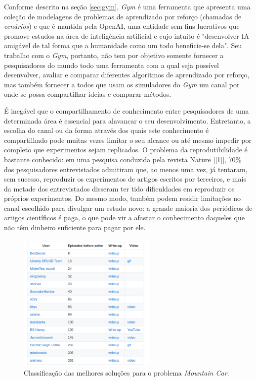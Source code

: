 \documentclass[cic,tc]{iiufrgs}
\begin{document}
Conforme descrito na seção \ref{sec:gym}, \textit{Gym} é uma ferramenta que
apresenta uma coleção de modelagens de problemas de aprendizado por reforço
(chamadas de \textit{cenários}) e que é mantida pela OpenAI, uma entidade sem
fins lucrativos que promove estudos na área de inteligência artificial e cujo
intuito é "desenvolver IA amigável de tal forma que a humanidade como um todo
beneficie-se dela". Seu trabalho com o \textit{Gym}, portanto, não tem por
objetivo somente fornecer a pesquisadores do mundo todo uma ferramenta com a
qual seja possível desenvolver, avaliar e comparar diferentes algoritmos de
aprendizado por reforço, mas também fornecer a todos que usam os simuladores do
\textit{Gym} um canal por onde se possa compartilhar ideias e comparar métodos.


É inegável que o compartilhamento de conhecimento entre pesquisadores de uma
determinada área é essencial para alavancar o seu desenvolvimento. Entretanto, a
escolha do canal ou da forma através dos quais este conhecimento é compartilhado
pode muitas vezes limitar o seu alcance ou até mesmo impedir por completo que
experimentos sejam replicados. O problema da reprodutibilidade é bastante
conhecido: em uma pesquisa conduzida pela revista Nature [[1]], 70\% dos
pesquisadores entrevistados admitiram que, ao menos uma vez, já tentaram, sem
sucesso, reproduzir os experimentos de artigos escritos por terceiros, e mais da
metade dos entrevistados disseram ter tido dificuldades em reproduzir os
próprios experimentos. Do mesmo modo, também podem residir limitações no canal
escolhido para divulgar um estudo novo: a grande maioria dos periódicos de
artigos científicos é paga, o que pode vir a afastar o conhecimento daqueles que
não têm dinheiro suficiente para pagar por ele.


\begin{figure}[h]
    \caption{Classificação das melhores soluções para o problema
    \textit{Mountain Car}.}
    \begin{center}
      \includegraphics[width=0.6\textwidth]{leaderboard.png}
    \end{center}
    \label{fig:leaderboard}
\end{figure}
\end{document}
